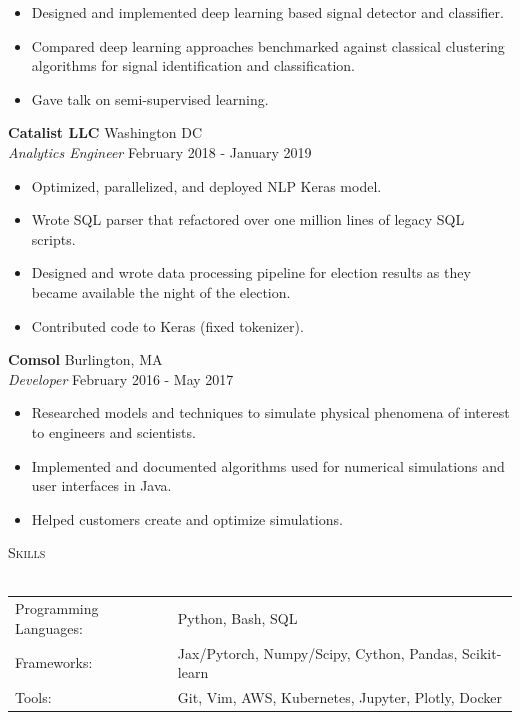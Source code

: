 \documentclass[a4paper]{article}
\newcommand{\lineunder} {
    \vspace*{-8pt} \\
    \hspace*{-18pt} \hrulefill \\
}
\newcommand{\header} [1] {
    {\hspace*{-18pt}\vspace*{6pt} \textsc{#1}}
    \vspace*{-6pt} \lineunder
}
\begin{document}
\begin{itemize} \itemsep 1pt
	\item Designed and implemented deep learning based signal detector and classifier.
	\item Compared deep learning approaches benchmarked against classical clustering algorithms for signal identification and classification.
	\item Gave talk on semi-supervised learning.
\end{itemize}
\textbf{Catalist LLC} \hfill Washington DC\\
\textit{Analytics Engineer} \hfill February 2018 - January 2019\\
\vspace{-1mm}
\begin{itemize} \itemsep 1pt
	\item Optimized, parallelized, and deployed NLP Keras model.
	\item Wrote SQL parser that refactored over one million lines of legacy SQL scripts.
	\item Designed and wrote data processing pipeline for election results as they became available the night of the election.
	\item Contributed code to Keras (fixed tokenizer).
\end{itemize}
\textbf{Comsol} \hfill Burlington, MA\\
\textit{Developer} \hfill February 2016 - May 2017\\
\vspace{-1mm}
\begin{itemize} \itemsep 1pt
	\item Researched models and techniques to simulate physical phenomena of interest to engineers and scientists.
	\item Implemented and documented algorithms used for numerical simulations and user interfaces in Java.
	\item Helped customers create and optimize simulations.
\end{itemize}

\header{Skills}
\begin{tabular}{ l l }
	Programming Languages: & Python, Bash, SQL                                      \\
	Frameworks:            & Jax/Pytorch, Numpy/Scipy, Cython, Pandas, Scikit-learn \\
	Tools:                 & Git, Vim, AWS, Kubernetes, Jupyter, Plotly, Docker     \\
\end{tabular}
\vspace{2mm}
\end{document}
